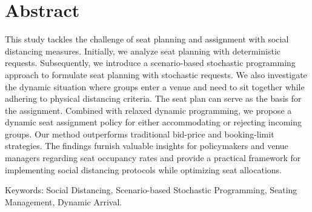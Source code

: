 
\section*{Abstract}
This study tackles the challenge of seat planning and assignment with social distancing measures. Initially, we analyze seat planning with deterministic requests. Subsequently, we introduce a scenario-based stochastic programming approach to formulate seat planning with stochastic requests. We also investigate the dynamic situation where groups enter a venue and need to sit together while adhering to physical distancing criteria. The seat plan can serve as the basis for the assignment. Combined with relaxed dynamic programming, we propose a dynamic seat assignment policy for either accommodating or rejecting incoming groups. Our method outperforms traditional bid-price and booking-limit strategies. The findings furnish valuable insights for policymakers and venue managers regarding seat occupancy rates and provide a practical framework for implementing social distancing protocols while optimizing seat allocations.


Keywords: Social Distancing, Scenario-based Stochastic Programming, Seating Management, Dynamic Arrival.

